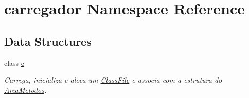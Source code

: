 \hypertarget{namespacecarregador}{}\section{carregador Namespace Reference}
\label{namespacecarregador}
\subsection*{Data Structures}
\begin{DoxyCompactItemize}
\item 
class \hyperlink{classcarregador_1_1c}{c}
\begin{DoxyCompactList}\small\item\em Carrega, inicializa e aloca um \hyperlink{structClassFile}{Class\+File} e associa com a estrutura do \hyperlink{structAreaMetodos}{Area\+Metodos}. \end{DoxyCompactList}\end{DoxyCompactItemize}
